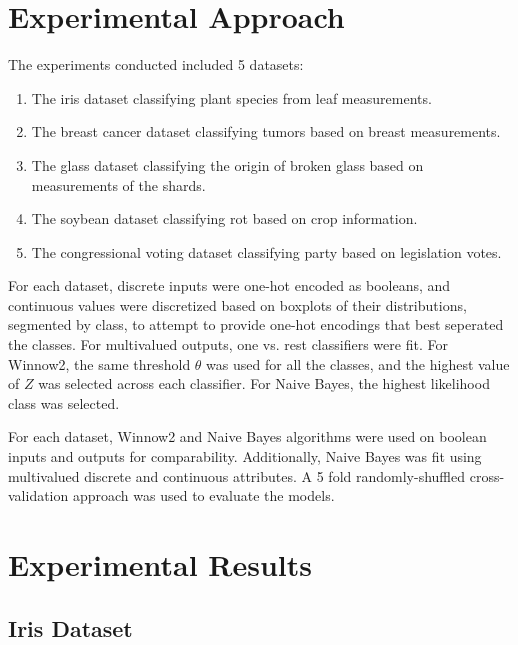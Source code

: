 \documentclass{amsart}
\begin{document}
    \section{Experimental Approach}
    The experiments conducted included 5 datasets:
    \begin{enumerate}
        \item The iris dataset classifying plant species from leaf measurements.
        \item The breast cancer dataset classifying tumors based on breast measurements.
        \item The glass dataset classifying the origin of broken glass based on measurements of the shards.
        \item The soybean dataset classifying rot based on crop information.
        \item The congressional voting dataset classifying party based on legislation votes.
    \end{enumerate}
    For each dataset, discrete inputs were one-hot encoded as booleans, and
    continuous values were discretized based on boxplots of their distributions, segmented by class,
    to attempt to provide one-hot encodings that best seperated the classes. For multivalued outputs,
    one vs. rest classifiers were fit. For Winnow2, the same threshold $\theta$ was used for all the classes,
    and the highest value of $Z$ was selected across each classifier.
    For Naive Bayes, the highest likelihood class was selected.

    For each dataset, Winnow2 and Naive Bayes algorithms were used on boolean inputs and outputs for
    comparability. Additionally, Naive Bayes was fit using multivalued discrete and
    continuous attributes. A 5 fold randomly-shuffled cross-validation approach was used to evaluate the models.

    \section{Experimental Results}
    \subsection{Iris Dataset}
\end{document}
